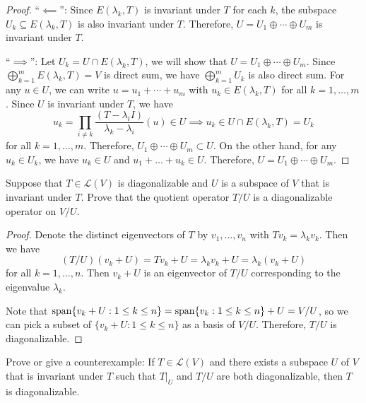 \documentclass{article}
\begin{document}
\begin{proof}
  ``\( \impliedby \)'': Since \( E(\lambda_k, T) \) is invariant under \( T \) for each \( k \), the subspace \( U_k \subseteq E(\lambda_k, T) \) is also invariant under \( T \). Therefore, \( U = U_1 \oplus \cdots \oplus U_m \) is invariant under \( T \).\par
  ``\( \implies \)'': Let \( U_k=U\cap E(\lambda_k,T) \), we will show that \( U=U_1 \oplus \cdots \oplus U_m \). Since \( \bigoplus_{k=1}^{m}E(\lambda_k,T)=V \) is direct sum, we have \( \bigoplus_{k=1}^{m}U_k \) is also direct sum. For any \( u\in U \), we can write \( u=u_1+\cdots+u_m \) with \( u_k\in E(\lambda_k,T) \) for all \( k=1,\dots,m \). Since \( U \) is invariant under \( T \), we have
  \[ u_k=\prod_{i\neq k}^{}\frac{(T-\lambda_i I)}{\lambda_k-\lambda_i}(u)\in U\implies u_k\in U\cap E(\lambda_k,T)=U_k \]
   for all \( k=1,\dots,m \). Therefore, \( U_1 \oplus \cdots \oplus U_m\subset U \). On the other hand, for any \( u_k\in U_k \), we have \( u_k\in U \) and \( u_1+\dots+u_k\in U \). Therefore, \( U=U_1 \oplus \cdots \oplus U_m \).
\end{proof}



\begin{problem}[5D-18]
Suppose that $T \in \mathcal{L}(V)$ is diagonalizable and $U$ is a subspace of $V$ that is invariant under $T$. Prove that the quotient operator $T/U$ is a diagonalizable operator on $V/U$.
\end{problem}

\begin{proof}
  Denote the distinct eigenvectors of \( T \) by \( v_1,\dots,v_n \) with \( Tv_k=\lambda_kv_k \). Then we have
  \[ (T/U)(v_k+U) = Tv_k+U = \lambda_k v_k+U = \lambda_k (v_k+U) \]
  for all \( k=1,\dots,n \). Then \( v_k+U \) is an eigenvector of \( T/U \) corresponding to the eigenvalue \( \lambda_k \). \par
  Note that \( \operatorname{span}\{v_k+U:1\le k\le n\}=\operatorname{span}\{v_k:1\le k\le n\}+U=V/U \), so we can pick a subset of \( \{v_k+U:1\le k\le n\} \) as a basis of \( V/U \). Therefore, \( T/U \) is diagonalizable.
\end{proof}



\begin{problem}[5D-19]
Prove or give a counterexample: If $T \in \mathcal{L}(V)$ and there exists a subspace $U$ of $V$ that is invariant under $T$ such that $T|_U$ and $T/U$ are both diagonalizable, then $T$ is diagonalizable.
\end{problem}
\end{document}
